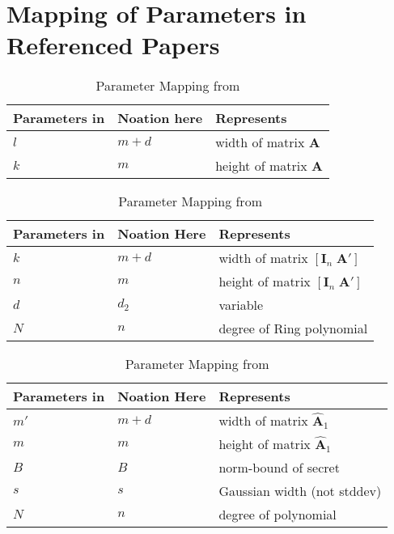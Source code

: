\section{Mapping of Parameters in Referenced Papers}
\begin{table}
    \centering
    \begin{tabular}[h]{lll}
        \toprule
        Parameters in \cite{LPR13} & Noation here & Represents                    \\\hline
        $l$                        & $m+d$        & width of matrix $\mathbf{A}$  \\
        $k$                        & $m$          & height of matrix $\mathbf{A}$ \\
        \bottomrule
    \end{tabular}
    \caption{Parameter Mapping from \cite{LPR13}}\label{tab:mapping-LPR13}
    \vspace{1cm}
    \centering
    \begin{tabular}[h]{lll}
        \toprule
        Parameters in \cite{BDLOP18} & Noation Here & Represents                                         \\\hline
        $k$                          & $m+d$        & width of matrix $[ \mathbf{I}_n \; \mathbf{A}' ]$  \\
        $n$                          & $m$          & height of matrix $[ \mathbf{I}_n \; \mathbf{A}' ]$ \\
        $d$                          & $d_2$        & variable                                           \\
        $N$                          & $n$          & degree of Ring polynomial                          \\
        \bottomrule
    \end{tabular}
    \caption{Parameter Mapping from \cite{BDLOP18}}\label{tab:mapping-BDLOP18}
    \vspace{1cm}
    \centering
    \begin{tabular}[h]{lll}
        \toprule
        Parameters in \cite{DOTT21} & Noation Here & Represents                            \\\hline
        $m'$                        & $m+d$        & width of matrix $\hat{\mathbf{A}}_1$  \\
        $m$                         & $m$          & height of matrix $\hat{\mathbf{A}}_1$ \\
        $B$                         & $B$          & norm-bound of secret                  \\
        $s$                         & $s$          & Gaussian width (not stddev)           \\
        $N$                         & $n$          & degree of polynomial                  \\
        \bottomrule
    \end{tabular}
    \caption{Parameter Mapping from \cite{DOTT21}}\label{tab:mapping-DOTT21}
\end{table}
